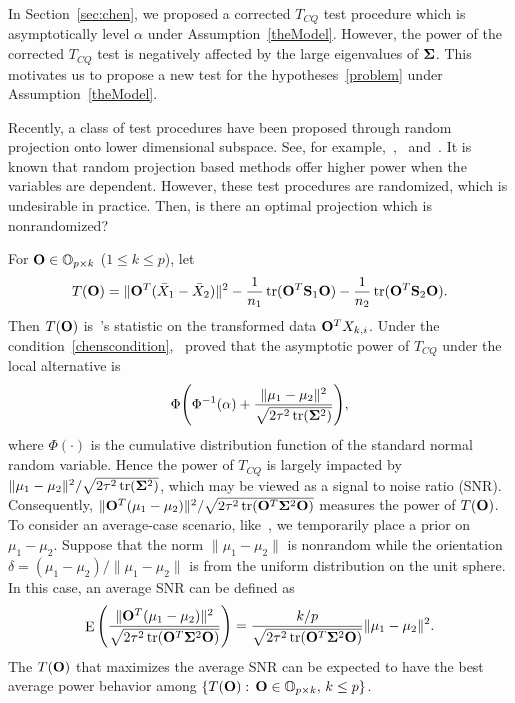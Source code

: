 \documentclass[review]{elsarticle}
\DeclareMathOperator{\mytr}{tr}
\DeclareMathOperator{\myE}{E}
\theoremstyle{plain}
\theoremstyle{definition}
\theoremstyle{remark}
\begin{document}
In Section~\ref{sec:chen}, we proposed a corrected $T_{CQ}$ test procedure which is asymptotically level $\alpha$ under Assumption~\ref{theModel}.
However, the power of the corrected $T_{CQ}$ test is negatively affected by the large eigenvalues of $\boldsymbol{\Sigma}$.
This motivates us to propose a new test for the hypotheses~\eqref{problem} under Assumption~\ref{theModel}.

Recently, a class of test procedures have been proposed through random projection onto lower dimensional subspace. See, for example,~\cite{Lopes2015A},~\cite{Thulin2014A} and~\cite{Srivastava2014RAPTT}.
It is known that random projection based methods offer higher power when the variables are dependent.
However, these test procedures are randomized, which is undesirable in practice.
Then, is there an optimal projection which is nonrandomized?

For $\mathbf{O}\in \mathbb{O}_{p\times k}$ ($1\leq k\leq p$), let
$$
    T(\BO)=\|\BO^T(\bar{X}_1-\bar{X}_2)\|^2-\frac{1}{n_1}\mytr(\BO^T \BS_1\BO)-\frac{1}{n_2}\mytr(\BO^T \BS_2\BO).
$$
Then $T(\mathbf{O})$ is~\cite{Chen2010A}'s statistic on the transformed data $\mathbf{O}^T X_{k,i}$.
Under the condition~\eqref{chenscondition},~\cite{Chen2010A} proved that the asymptotic power of $T_{CQ}$ under the local alternative is
$$
\Phi\Bigg(\Phi^{-1}(\alpha)+\frac{\|\mu_1-\mu_2\|^2}{\sqrt{2\tau^2\mytr(\bSigma^2)}}\Bigg),
$$
where $\Phi(\cdot)$ is the cumulative distribution function of the standard normal random variable.
Hence the power of $T_{CQ}$ is largely impacted by $\|\mu_1-\mu_2\|^2/\sqrt{2\tau^2\mytr(\bSigma^2)}$, which may be viewed as a signal to noise ratio (SNR).
Consequently, $\|\BO^T (\mu_1-\mu_2)\|^2/\sqrt{2\tau^2\mytr(\BO^T \bSigma^2 \BO)}$ measures the power of $T(\mathbf{O})$.
To consider an average-case scenario, like~\cite{Lopes2015A}, we temporarily place a prior on $\mu_1-\mu_2$.
Suppose that the norm $\|\mu_1-\mu_2\|$ is nonrandom while the orientation $\delta=(\mu_1-\mu_2)/\|\mu_1-\mu_2\|$ is from the uniform distribution on the unit sphere.
In this case, an average SNR can be defined as
\begin{equation}\label{touteng}
\myE \Bigg( \frac{\|\BO^T (\mu_1-\mu_2)\|^2}{\sqrt{2\tau^2\mytr(\BO^T \bSigma^2 \BO)}}\Bigg)
=  \frac{k/p}{\sqrt{2\tau^2\mytr(\BO^T \bSigma^2 \BO)}}\|\mu_1-\mu_2\|^2.
\end{equation}
The $T(\mathbf{O})$ that maximizes the average SNR can be expected to have the best average power behavior among $\{T(\mathbf{O}):\, \mathbf{O}\in \mathbb{O}_{p\times k},\,  k\leq p\}$.
\end{document}
